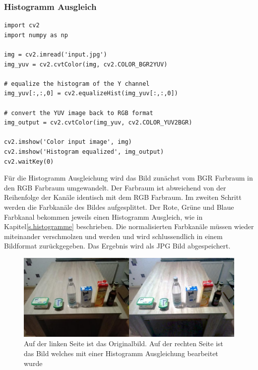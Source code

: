\documentclass[a4paper,12pt,oneside]{article}
\begin{document}
\subsubsection{Histogramm Ausgleich}
\begin{lstlisting}
import cv2
import numpy as np

img = cv2.imread('input.jpg')
img_yuv = cv2.cvtColor(img, cv2.COLOR_BGR2YUV)

# equalize the histogram of the Y channel
img_yuv[:,:,0] = cv2.equalizeHist(img_yuv[:,:,0])

# convert the YUV image back to RGB format
img_output = cv2.cvtColor(img_yuv, cv2.COLOR_YUV2BGR)

cv2.imshow('Color input image', img)
cv2.imshow('Histogram equalized', img_output)
cv2.waitKey(0)
\end{lstlisting}
Für die Histogramm Ausgleichung \cite{histogram2012equalisation} wird das Bild zunächst vom BGR Farbraum in den RGB Farbraum umgewandelt. Der Farbraum ist abweichend von der Reihenfolge der Kanäle identisch mit dem RGB Farbraum. Im zweiten Schritt werden die Farbkanäle des Bildes aufgesplittet. Der Rote, Grüne und Blaue Farbkanal bekommen jeweils einen Histogramm Ausgleich, wie in Kapitel\ref{s.histogramme} beschrieben. Die normalisierten Farbkanäle müssen wieder miteinander verschmolzen und werden und wird schlussendlich in einem Bildformat zurückgegeben. Das Ergebnis wird als JPG Bild abgespeichert.
\begin{figure}
	[h]
	\centering
	\includegraphics[scale=0.3]{Sources/histeq.jpg}
	\caption{Auf der linken Seite ist das Originalbild. Auf der rechten Seite ist das Bild welches mit einer Histogramm Ausgleichung bearbeitet wurde}
	\label{img:histogrameq}
\end{figure}
	
\end{document}
